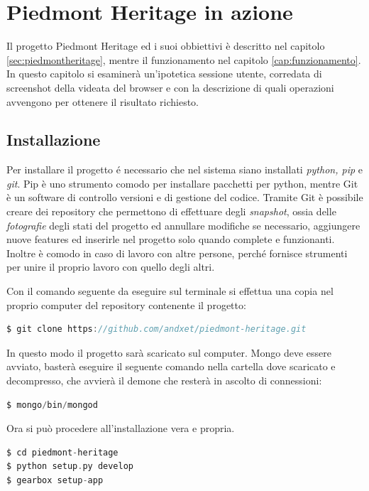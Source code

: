 \chapter{Piedmont Heritage in azione}\label{cap:azione}%
Il progetto Piedmont Heritage ed i suoi obbiettivi è descritto nel capitolo \ref{sec:piedmontheritage}, mentre il funzionamento nel capitolo \ref{cap:funzionamento}. In questo capitolo si esaminerà un'ipotetica sessione utente, corredata di screenshot della videata del browser e con la descrizione di quali operazioni avvengono per ottenere il risultato richiesto.
\section{Installazione}
Per installare il progetto \'e necessario che nel sistema siano installati \emph{python, pip} e \emph{git}. Pip è uno strumento comodo per installare pacchetti per python, mentre Git è un software di controllo versioni e di gestione del codice. Tramite Git è possibile creare dei repository che permettono di effettuare degli \emph{snapshot}, ossia delle \emph{fotografie} degli stati del progetto ed annullare modifiche se necessario, aggiungere nuove features ed inserirle nel progetto solo quando complete e funzionanti. Inoltre è comodo in caso di lavoro con altre persone, perché fornisce strumenti per unire il proprio lavoro con quello degli altri.

Con il comando seguente da eseguire sul terminale si effettua una copia nel proprio computer del repository contenente il progetto:

\begin{lstlisting}[language=c]
$ git clone https://github.com/andxet/piedmont-heritage.git
\end{lstlisting}

In questo modo il progetto sarà scaricato sul computer. Mongo deve essere avviato, basterà eseguire il seguente comando nella cartella dove scaricato e decompresso, che avvierà il demone che resterà in ascolto di connessioni:

\begin{lstlisting}[language=c]
$ mongo/bin/mongod
\end{lstlisting} 

Ora si può procedere all'installazione vera e propria.
\begin{lstlisting}[language=c]
$ cd piedmont-heritage
$ python setup.py develop
$ gearbox setup-app
\end{lstlisting} 

